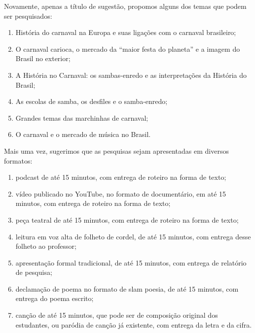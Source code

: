 \documentclass[11pt]{extarticle}
\begin{document}
Novamente, apenas a título de sugestão, propomos alguns dos temas que
podem ser pesquisados:

\begin{enumerate}

\item História do carnaval na Europa e suas ligações com o carnaval
brasileiro;

\item O carnaval carioca, o mercado da ``maior festa do planeta'' e a
imagem do Brasil no exterior;

\item A História no Carnaval: os sambas-enredo e as interpretações da
História do Brasil;

\item As escolas de samba, os desfiles e o samba-enredo;

\item Grandes temas das marchinhas de carnaval;

\item O carnaval e o mercado de música no Brasil.

\end{enumerate} 


Mais uma vez, sugerimos que as pesquisas sejam apresentadas em diversos
formatos:


\begin{enumerate}

\item podcast de até 15 minutos, com entrega de roteiro na forma de texto;

\item vídeo publicado no YouTube, no formato de documentário, em até 15
minutos, com entrega de roteiro na forma de texto;

\item peça teatral de até 15 minutos, com entrega de roteiro na forma de
texto;

\item leitura em voz alta de folheto de cordel, de até 15 minutos, com
entrega desse folheto ao professor;

\item apresentação formal tradicional, de até 15 minutos, com entrega de
relatório de pesquisa;

\item declamação de poema no formato de slam poesia, de até 15 minutos, com
entrega do poema escrito;

\item canção de até 15 minutos, que pode ser de composição original dos
estudantes, ou paródia de canção já existente, com entrega da letra e da
cifra.

\end{enumerate} 
\end{document}
